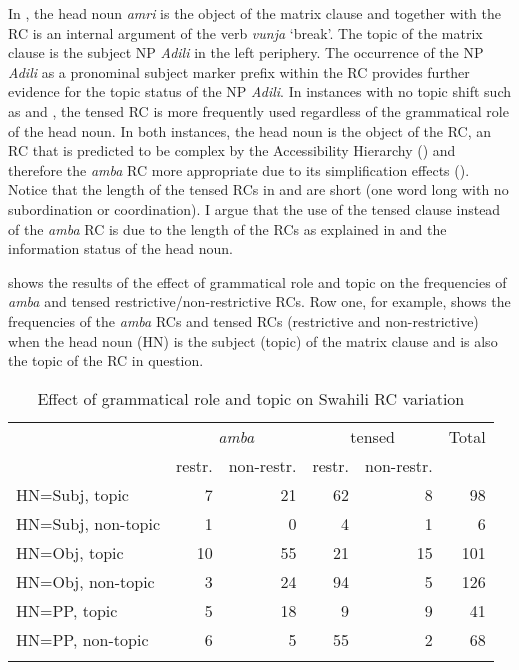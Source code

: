 \documentclass[output=paper,colorlinks,citecolor=brown]{langscibook}
\begin{document}

In , the head noun \textit{amri} is the object of the matrix clause and together with the RC is an internal argument of the verb \textit{vunja} ‘break’. The topic of the matrix clause is the subject NP \textit{Adili} in the left periphery. The occurrence of the NP \textit{Adili} as a pronominal subject marker prefix within the RC provides further evidence for the topic status of the NP \textit{Adili}. In instances with no topic shift such as  and , the tensed RC is more frequently used regardless of the grammatical role of the head noun. In both instances, the head noun is the object of the RC, an RC that is predicted to be complex by the Accessibility Hierarchy (\citealt{KeenanComrie1977}) and therefore the \textit{amba} RC more appropriate due to its simplification effects (\citealt{Ashton1944, Schadeberg1989}). Notice that the length of the tensed RCs in  and  are short (one word long with no subordination or coordination). I argue that the use of the tensed clause instead of the \textit{amba} RC is due to the length of the RCs as explained in  and the information status of the head noun.

 shows the results of the effect of grammatical role and topic on the frequencies of \textit{amba} and tensed restrictive/non-restrictive RCs. Row one, for example, shows the frequencies of the \textit{amba} RCs and tensed RCs (restrictive and non-restrictive) when the head noun (HN) is the subject (topic) of the matrix clause and is also the topic of the RC in question.

\begin{table}
    \begin{tabular}{lrrrrr}
    \lsptoprule
        & \multicolumn{2}{c}{\textit{amba}} & \multicolumn{2}{c}{tensed} & Total\\\cmidrule(lr){2-3}\cmidrule(lr){4-5}
        & restr. & non-restr.& restr.& non-restr.& \\\midrule
        HN=Subj, topic     & 7 & 21 & 62 & 8 & 98\\
        HN=Subj, non-topic & 1 & 0 & 4 & 1 & 6\\
        HN=Obj, topic & 10 & 55 & 21 & 15 & 101\\
        HN=Obj, non-topic & 3 & 24 & 94 & 5 & 126\\
        HN=PP, topic & 5 & 18 & 9 & 9 & 41\\
        HN=PP, non-topic & 6 & 5 & 55 & 2 & 68\\
    \lspbottomrule
    \end{tabular}
    \caption{Effect of grammatical role and topic on Swahili RC variation}
    \label{tab:mwamzandi:2}
\end{table}
\end{document}
